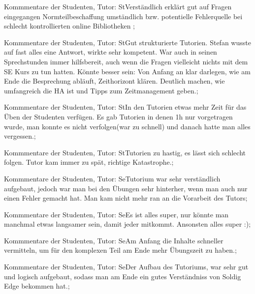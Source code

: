 \documentclass[10pt]{beamer}
\begin{document}
\begin{frame}[fragile]{Kommmentare der Studenten, Tutor: St}Verständlich erklärt
 gut auf Fragen eingegangen
 Normteilbeschaffung umständlich bzw. potentielle Fehlerquelle bei schlecht kontrollierten online Bibliotheken
 ;
 \end{frame}
\begin{frame}[fragile]{Kommmentare der Studenten, Tutor: St}Gut strukturierte Tutorien. Stefan wusste auf fast alles eine Antwort, wirkte sehr kompetent. War auch in seinen Sprechstunden immer hilfsbereit, auch wenn die Fragen vielleicht nichts mit dem SE Kurs zu tun hatten.
 Könnte besser sein: Von Anfang an klar darlegen, wie am Ende die Besprechung abläuft, Zeithorizont klären. Deutlich machen, wie umfangreich die HA ist und Tipps zum Zeitmanagement geben.;
 \end{frame}
\begin{frame}[fragile]{Kommmentare der Studenten, Tutor: St}In den Tutorien etwas mehr Zeit für das Üben der Studenten verfügen. Es gab Tutorien in denen 1h nur vorgetragen wurde, man konnte es nicht verfolgen(war zu schnell) und danach hatte man alles vergessen.;
 \end{frame}
\begin{frame}[fragile]{Kommmentare der Studenten, Tutor: St}Tutorien zu hastig, es lässt sich schlecht folgen. Tutor kam immer zu spät, richtige Katastrophe.;
 \end{frame}
\begin{frame}[fragile]{Kommmentare der Studenten, Tutor: Se}Tutorium war sehr verständlich aufgebaut, jedoch war man bei den Übungen sehr hinterher, wenn man auch nur einen Fehler gemacht hat. Man kam nicht mehr ran an die Vorarbeit des Tutors;
 \end{frame}
\begin{frame}[fragile]{Kommmentare der Studenten, Tutor: Se}Es ist alles super, nur könnte man manchmal etwas langsamer sein, damit jeder mitkommt. Ansonsten alles super :);
 \end{frame}
\begin{frame}[fragile]{Kommmentare der Studenten, Tutor: Se}Am Anfang die Inhalte schneller vermitteln, um für den komplexen Teil am Ende mehr Übungszeit zu haben.;
 \end{frame}
\begin{frame}[fragile]{Kommmentare der Studenten, Tutor: Se}Der Aufbau des Tutoriums, war sehr gut und logisch aufgebaut, sodass man am Ende ein gutes Verständniss von Soldig Edge bekommen hat.;
 \end{frame}
\end{document}
